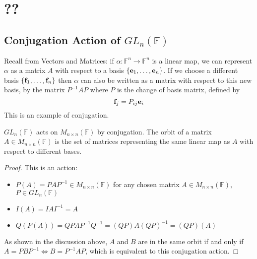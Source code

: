\documentclass{article}
\begin{document}
\section{??}
\subsection{Conjugation Action of $GL_n(\mathbb F)$}
Recall from Vectors and Matrices: if $\alpha\colon \mathbb F^n \to \mathbb F^n$ is a linear map, we can represent $\alpha$ as a matrix $A$ with respect to a basis $\{ \vb e_1, \dots, \vb e_n \}$. If we choose a different basis $\{ \vb f_1, \dots, \vb f_n \}$ then $\alpha$ can also be written as a matrix with respect to this new basis, by the matrix $P^{-1}AP$ where $P$ is the change of basis matrix, defined by
\[ \vb f_j = P_{ij}\vb e_i \]
This is an example of conjugation.
\begin{proposition}
    $GL_n(\mathbb F)$ acts on $M_{n \times n}(\mathbb F)$ by conjugation. The orbit of a matrix $A \in M_{n \times n}(\mathbb F)$ is the set of matrices representing the same linear map as $A$ with respect to different bases.
\end{proposition}
\begin{proof}
    This is an action:
    \begin{itemize}
        \item $P(A) = PAP^{-1} \in M_{n \times n}(\mathbb F)$ for any chosen matrix $A \in M_{n \times n}(\mathbb F)$, $P \in GL_n(\mathbb F)$
        \item $I(A) = IAI^{-1} = A$
        \item $Q(P(A)) = QPAP^{-1}Q^{-1} = (QP)A(QP)^{-1} = (QP)(A)$
    \end{itemize}
    As shown in the discussion above, $A$ and $B$ are in the same orbit if and only if $A = PBP^{-1} \iff B = P^{-1}AP$, which is equivalent to this conjugation action.
\end{proof}
\end{document}
